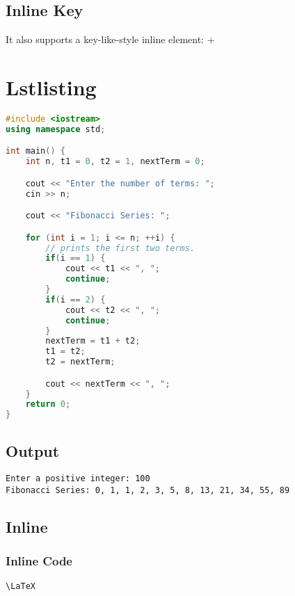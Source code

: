 \documentclass[10pt]{article}
\begin{document}
\subsection{Inline Key}

It also supports a key-like-style inline element:  + 

\section{Lstlisting}

\begin{lstlisting}[caption=Example in C++,language=c++]
#include <iostream>
using namespace std;

int main() {
	int n, t1 = 0, t2 = 1, nextTerm = 0;

	cout << "Enter the number of terms: ";
	cin >> n;

	cout << "Fibonacci Series: ";

	for (int i = 1; i <= n; ++i) {
		// prints the first two terms.
		if(i == 1) {
			cout << t1 << ", ";
			continue;
		}
		if(i == 2) {
			cout << t2 << ", ";
			continue;
		}
		nextTerm = t1 + t2;
		t1 = t2;
		t2 = nextTerm;

		cout << nextTerm << ", ";
	}
	return 0;
}
\end{lstlisting}

\subsection{Output}

\begin{lstlisting}[style=lstoutput]
Enter a positive integer: 100
Fibonacci Series: 0, 1, 1, 2, 3, 5, 8, 13, 21, 34, 55, 89
\end{lstlisting}

\subsection{Inline}

\subsubsection{Inline Code}

\lstinline{\LaTeX}
\end{document}
